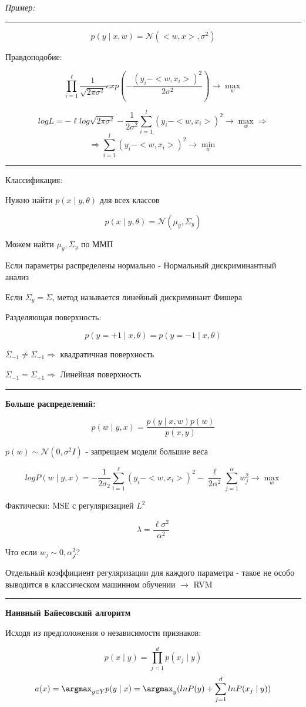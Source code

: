 \documentclass[a4paper, 12pt]{article}
\begin{document}
\textit{Пример:}

\rule{\linewidth}{0.5pt}
\[p(y \mid x, w) = \mathcal{N}(<w, x>, \sigma^{2})\]

Правдоподобие:

\[\prod_{i = 1}^{\ell}\frac{1}{\sqrt{2 \pi \sigma^{2}}}
exp(-\frac{(y_i - <w, x_i>)^{2}}{2\sigma^{2}}) 
\rightarrow \max_{w}\]

\[logL = -\ell log\sqrt{2 \pi \sigma^{2}} - 
\frac{1}{2 \sigma^{2}}\sum_{i = 1}^{l}(y_i - <w, x_i>)^2
\rightarrow \max_{w} \Rightarrow\]
\[\Rightarrow \sum_{i = 1}^{l}(y_i - <w, x_i>)^2 
\rightarrow \min_{w}\]
\rule{\linewidth}{0.5pt}
\newline

Классификация:

Нужно найти $p(x \mid y, \theta)$ для всех классов

\[p(x \mid y, \theta) = \mathcal{N}(\mu_{y}, \Sigma_{y})\]

Можем найти $\mu_y, \Sigma_y$ по ММП

Если параметры распределены нормально - 
Нормальный дискриминантный анализ

Если $\Sigma_y = \Sigma$, метод называется
линейный дискриминант Фишера

Разделяющая поверхность:

\[p(y = +1 \mid x, \theta) = p(y = -1 \mid x, \theta)\]

$\Sigma_{-1} \neq \Sigma_{+1} \Rightarrow$ квадратичная поверхность

$\Sigma_{-1} = \Sigma_{+1} \Rightarrow$ Линейная поверхность

\rule{\linewidth}{0.5pt}

\textbf{Больше распределений:}

\[p(w \mid y, x) = \frac{p(y \mid x, w)p(w)}{p(x, y)}\]

$p(w) \sim \mathcal{N}(0, \sigma^{2}I)$ - запрещаем модели большие веса

\[logP(w \mid y, x) = 
-\frac{1}{2\sigma_{2}}\sum_{i = 1}^{\ell}(y_i - <w, x_i>)^2 -
\frac{\ell}{2\alpha^{2}}\sum_{j = 1}^{\alpha}w_{j}^{2} 
\rightarrow \max_{w}\]

Фактически: MSЕ с регуляризацией $L^2$

\[\lambda = \frac{\ell \sigma^{2}}{\alpha^{2}}\]

Что если $w_j \sim \mathcal{0, \alpha_j^2}$?

Отдельный коэффициент регуляризации для каждого
параметра - такое не особо выводится в классическом 
машинном обучении $\rightarrow$ RVM

\rule{\linewidth}{0.5pt}

\textbf{Наивный Байесовский алгоритм}

Исходя из предположения о независимости признаков:

\[p(x \mid y) = \prod_{j = 1}^{d}p(x_j \mid y)\]
\[a(x) = \argmax_{y \in Y}p(y \mid x) = 
\argmax_{y}(lnP(y) + \sum_{j = 1}^d lnP(x_j \mid y))\]
\end{document}
